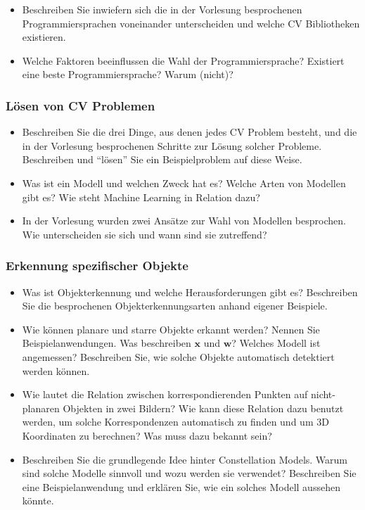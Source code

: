 \documentclass[paper=A4,11pt]{scrartcl}
\renewcommand{\vec}[1]{\ensuremath{\mathbf{#1}}}
\newcommand{\vx}{\vec{x}}
\newcommand{\vw}{\vec{w}}
\begin{document}
\begin{itemize}
    \item Beschreiben Sie inwiefern sich die in der Vorlesung besprochenen Programmiersprachen voneinander unterscheiden und welche CV Bibliotheken existieren.
    \item Welche Faktoren beeinflussen die Wahl der Programmiersprache? Existiert eine beste Programmiersprache? Warum (nicht)?
\end{itemize}

\subsubsection*{Lösen von CV Problemen} %

\begin{itemize}
    \item Beschreiben Sie die drei Dinge, aus denen jedes CV Problem besteht, und die in der Vorlesung besprochenen Schritte zur Lösung solcher Probleme. Beschreiben und \enquote{lösen} Sie ein Beispielproblem auf diese Weise.
    \item Was ist ein Modell und welchen Zweck hat es? Welche Arten von Modellen gibt es? Wie steht Machine Learning in Relation dazu?
    \item In der Vorlesung wurden zwei Ansätze zur Wahl von Modellen besprochen. Wie unterscheiden sie sich und wann sind sie zutreffend?
\end{itemize}

\subsubsection*{Erkennung spezifischer Objekte} %

\begin{itemize}
    \item Was ist Objekterkennung und welche Herausforderungen gibt es? Beschreiben Sie die besprochenen Objekterkennungsarten anhand eigener Beispiele.
    \item Wie können planare und starre Objekte erkannt werden? Nennen Sie Beispielanwendungen. Was beschreiben $\vx$ und $\vw$? Welches Modell ist angemessen? Beschreiben Sie, wie solche Objekte automatisch detektiert werden können.
    \item Wie lautet die Relation zwischen korrespondierenden Punkten auf nicht-planaren Objekten in zwei Bildern? Wie kann diese Relation dazu benutzt werden, um solche Korrespondenzen automatisch zu finden und um 3D Koordinaten zu berechnen? Was muss dazu bekannt sein?
    \item Beschreiben Sie die grundlegende Idee hinter Constellation Models. Warum sind solche Modelle sinnvoll und wozu werden sie verwendet? Beschreiben Sie eine Beispielanwendung und erklären Sie, wie ein solches Modell aussehen könnte.
\end{itemize}
\end{document}
